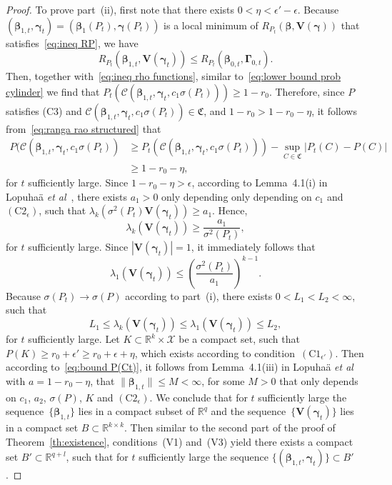 \documentclass{article}
\numberwithin{equation}{section}
\theoremstyle{plain}
\newcommand{\R}{\mathbb{R}}
\newcommand{\bbeta}{\bm\beta}
\newcommand{\bgamma}{\bm\gamma}
\newcommand{\bGamma}{\bm\Gamma}
\newcommand{\bV}{\mathbf{V}}
\begin{document}
\begin{proof}
To prove part~(ii), 
first note that there exists $0<\eta<\epsilon'-\epsilon$.
Because $(\bbeta_{1,t},\bgamma_t)=(\bbeta_1(P_t),\bgamma(P_t))$
is a local minimum of $R_{P_t}(\bbeta,\bV(\bgamma))$
that satisfies~\eqref{eq:ineq RP}, we have
\begin{equation}
\label{eq:ineq RPt}
R_{P_t}(\bbeta_{1,t},\bV(\bgamma_t))\leq R_{P_t}(\bbeta_{0,t},\bGamma_{0,t}).
\end{equation}
Then, together with~\eqref{eq:ineq rho functions}, similar to~\eqref{eq:lower bound prob cylinder}
we find that
$P_t(\mathcal{C}(\bbeta_{1,t},\bgamma_t,c_1\sigma(P_t)))\geq 1-r_0$.
Therefore, since $P$ satisfies (C3) and $\mathcal{C}(\bbeta_{1,t},\bgamma_t,c_1\sigma(P_t))\in \mathfrak{C}$,
and $1-r_0>1-r_0-\eta$,
it follows from~\eqref{eq:ranga rao structured} that
\begin{equation}
\label{eq:bound P(Ct)}
\begin{split}
P(\mathcal{C}(\bbeta_{1,t},\bgamma_t,c_1\sigma(P_t))
&\geq
P_t(\mathcal{C}(\bbeta_{1,t},\bgamma_t,c_1\sigma(P_t)))
-
\sup_{C\in \mathfrak{C}}
\left|
P_t(C)-P(C)
\right|\\
&\geq
1-r_0-\eta,
\end{split}
\end{equation}
for $t$ sufficiently large.
Since $1-r_0-\eta>\epsilon$, 
according to Lemma~4.1(i) in Lopuha\"a \textit{et al}~\cite{lopuhaa-gares-ruizgazen2023},
there exists $a_1>0$ only depending only depending on $c_1$ and $(\mathrm{C2}_{\epsilon})$, such that
$\lambda_k(\sigma^2(P_t)\bV(\bgamma_t))\geq a_1$.
Hence,
\[
\lambda_k(\bV(\bgamma_t))\geq 
\frac{a_1}{\sigma^2(P_t)},
\]
for $t$ sufficiently large.
Since $|\bV(\bgamma_t)|=1$, it immediately follows that
\[
\lambda_1(\bV(\bgamma_t))\leq \left(\frac{\sigma^2(P_t)}{a_1}\right)^{k-1}.
\]
Because $\sigma(P_t)\to\sigma(P)$ according to part~(i), there exists $0<L_1<L_2<\infty$, such that
\begin{equation}
\label{eq:bounds V1t}
L_1\leq \lambda_k(\bV(\bgamma_t))
\leq
\lambda_1(\bV(\bgamma_t))\leq L_2,
\end{equation}
for $t$ sufficiently large.
Let $K\subset\R^{k}\times \mathcal{X}$ be a compact set, such that $P(K)\geq r_0+\epsilon'\geq r_0+\epsilon+\eta$, 
which exists according to condition~$(\mathrm{C1}_{\epsilon'})$.
Then according to~\eqref{eq:bound P(Ct)}, it follows from
Lemma~4.1(iii) in Lopuha\"a \textit{et al}~\cite{lopuhaa-gares-ruizgazen2023} 
with $a=1-r_0-\eta$, that $\|\bbeta_{1,t}\|\leq M<\infty$, 
for some $M>0$ that only depends on $c_1$, $a_2$, $\sigma(P)$, $K$ and $(\text{C2}_\epsilon)$.
We conclude that for $t$ sufficiently large the sequence~$\{\bbeta_{1,t}\}$ 
lies in a compact subset of $\R^q$ and 
the sequence~$\{\bV(\bgamma_t)\}$ lies in a compact set $B\subset\R^{k\times k}$.
Then similar to the second part of the proof of Theorem~\ref{th:existence},
conditions~(V1) and~(V3) yield there exists a compact set $B'\subset\R^{q+l}$,
such that for $t$ sufficiently large 
the sequence $\{(\bbeta_{1,t},\bgamma_t)\}\subset B'$.


\end{proof}
\end{document}
